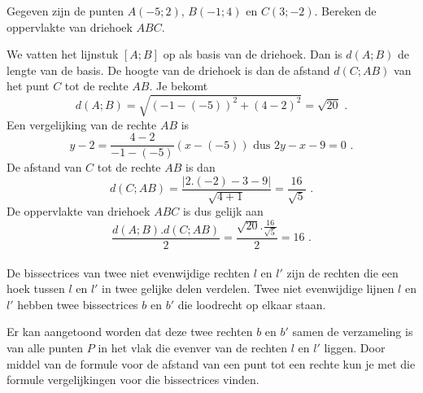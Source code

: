 \begin{voorbeeld}
	Gegeven zijn de punten $A(-5;2)$, $B(-1;4)$ en $C(3;-2)$.
Bereken de oppervlakte van driehoek $ABC$.



We vatten het lijnstuk $[A;B]$ op als basis van de driehoek.
Dan is $d(A;B)$ de lengte van de basis.
De hoogte van de driehoek is dan de afstand $d(C;AB)$ van het punt $C$ tot de rechte $AB$.
Je bekomt
\[
d(A;B)=\sqrt { (-1-(-5))^2+(4-2)^2}=\sqrt {20} \text { .}
\]
Een vergelijking van de rechte $AB$ is
\[
y-2=\frac {4-2}{-1-(-5)}(x-(-5)) \text { dus } 2y-x-9=0 \text { .}
\]
De afstand van $C$ tot de rechte $AB$ is dan
\[
d(C;AB)=\frac {\vert 2.(-2)-3-9 \vert}{\sqrt{4+1}}=\frac {16}{\sqrt {5}} \text { .}
\]
De oppervlakte van driehoek $ABC$ is dus gelijk aan
\[
\frac {d(A;B).d(C;AB)}{2}=\frac { \sqrt {20}.\frac {16}{\sqrt {5}}}{2}=16 \text { .}
\]\\

De bissectrices van twee niet evenwijdige rechten $l$ en $l'$ zijn de rechten die een hoek tussen $l$ en $l'$ in twee gelijke delen verdelen.
Twee niet evenwijdige lijnen $l$ en $l'$ hebben twee bissectrices $b$ en $b'$ die loodrecht op elkaar staan.



Er kan aangetoond worden dat deze twee rechten $b$ en $b'$ samen de verzameling is van alle punten $P$ in het vlak die evenver van de rechten $l$ en $l'$ liggen.
Door middel van de formule voor de afstand van een punt tot een rechte kun je met die formule vergelijkingen voor die bissectrices vinden.\\
\end{voorbeeld}

